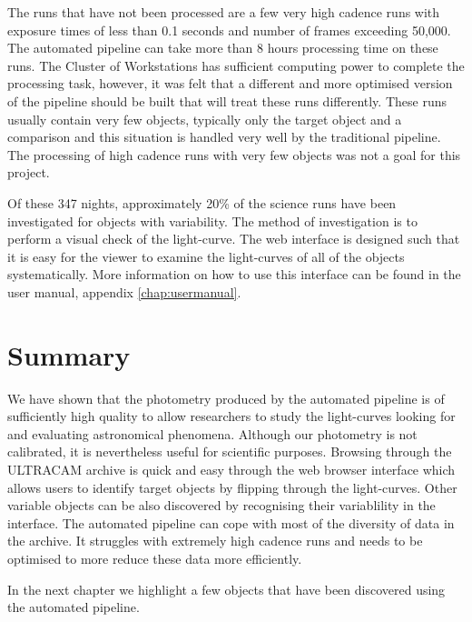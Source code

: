 The runs that have not been processed are a few very high cadence runs with exposure times of less than 0.1 seconds and number of frames exceeding 50,000. The automated pipeline can take more than 8 hours processing time on these runs. The Cluster of Workstations has sufficient computing power to complete the processing task, however, it was felt that a different  and more optimised version of the pipeline should be built that will treat these runs differently. These runs usually contain very few objects, typically only the target object and a comparison and this situation is handled very well by the traditional pipeline. The processing of high cadence runs with very few objects was not a goal for this project. 

Of these 347 nights, approximately 20\% of the science runs have been investigated for objects with variability. The method of investigation is to perform a visual check of the light-curve. The web interface is designed such that it is easy for the viewer to examine the light-curves of all of the objects systematically. More information on how to use this interface can be found in the user manual, appendix \ref{chap:usermanual}. 

\section{Summary}
We have shown that the photometry produced by the automated pipeline is of sufficiently high quality to allow researchers to study the light-curves looking for and evaluating astronomical phenomena. Although our photometry is not calibrated, it is nevertheless useful for scientific purposes. Browsing through the ULTRACAM archive is quick and easy through the web browser interface which allows users to identify target objects by flipping through the light-curves. Other variable objects can be also discovered by recognising their variablility in the interface. The automated pipeline can cope with most of the diversity of data in the archive. It struggles with extremely high cadence runs and needs to be optimised to more reduce these data more efficiently.

In the next chapter we highlight a few objects that have been discovered using the automated pipeline. 
